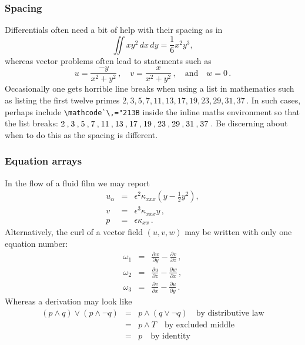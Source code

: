 \subsubsection{Spacing}

Differentials often need a bit of help with their spacing as in
\[
\iint xy^2\,dx\,dy 
=\frac{1}{6}x^2y^3,
\]
whereas vector problems often lead to statements such as
\[
u=\frac{-y}{x^2+y^2}\,,\quad
v=\frac{x}{x^2+y^2}\,,\quad\text{and}\quad
w=0\,.
\]
Occasionally one gets horrible line breaks when using a list in mathematics such as listing the first twelve primes  \(2,3,5,7,11,13,17,19,23,29,31,37\)\,.
In such cases, perhaps include \verb|\mathcode`\,="213B| inside the inline maths environment so that the list breaks: \(\mathcode`\,="213B 2,3,5,7,11,13,17,19,23,29,31,37\)\,.
Be discerning about when to do this as the spacing is different.




\subsubsection{Equation arrays}

In the flow of a fluid film we may report
\begin{eqnarray}
u_\alpha & = & \epsilon^2 \kappa_{xxx} 
\left( y-\frac{1}{2}y^2 \right),
\label{equ}  \\
v & = & \epsilon^3 \kappa_{xxx} y\,,
\label{eqv}  \\
p & = & \epsilon \kappa_{xx}\,.
\label{eqp}
\end{eqnarray}
Alternatively, the curl of a vector field $(u,v,w)$ may be written 
with only one equation number:
\begin{eqnarray}
\omega_1 & = &
\frac{\partial w}{\partial y}-\frac{\partial v}{\partial z}\,,
\nonumber  \\
\omega_2 & = & 
\frac{\partial u}{\partial z}-\frac{\partial w}{\partial x}\,,
\label{eqcurl}  \\
\omega_3 & = & 
\frac{\partial v}{\partial x}-\frac{\partial u}{\partial y}\,.
\nonumber
\end{eqnarray}
Whereas a derivation may look like
\begin{eqnarray*}
	(p\wedge q)\vee(p\wedge\neg q) & = & p\wedge(q\vee\neg q)
	\quad\text{by distributive law}  \\
	& = & p\wedge T \quad\text{by excluded middle}  \\
	& = & p \quad\text{by identity}
\end{eqnarray*}

